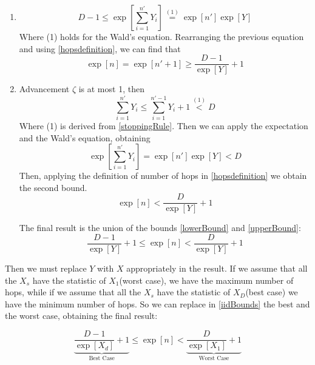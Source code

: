 \begin{enumerate}
		\item
			$$ D-1 \le \exp\left[\sum_{i=1}^{n'} Y_i\right] \stackrel{(1)}{=} \exp[n']\exp[Y] $$
			Where (1) holds for the Wald's equation. Rearranging the previous equation and using \eqref{hopsdefinition}, we can find that
			\begin{equation}\label{lowerBound}
				\exp[n] = \exp[n'+1] \ge \frac{D-1}{\exp[Y]} +1
			\end{equation}
		\item
			Advancement $\zeta$ is at most 1, then
			$$\sum_{i=1}^{n'} Y_i \le \sum_{i=1}^{n'-1} Y_i +1 \stackrel{(1)}{<} D$$
			Where (1) is derived from \eqref{stoppingRule}. Then we can apply the expectation and the Wald's equation, obtaining
			$$\exp\left[\sum_{i=1}^{n'} Y_i\right] = \exp[n']\exp[Y] < D$$
			Then, applying the definition of number of hops in \eqref{hopsdefinition} we obtain the second bound.
			\begin{equation}\label{upperBound}
				\exp[n] < \frac{D}{\exp[Y]} + 1
			\end{equation}

			The final result is the union of the bounds \eqref{lowerBound} and \eqref{upperBound}:
			\begin{equation}\label{iidBounds}
				\frac{D-1}{\exp[Y]} +1 \le \exp[n] < \frac{D}{\exp[Y]} + 1
			\end{equation}
\end{enumerate}
Then we must replace $Y$ with $X$ appropriately in the result.
If we assume that all the $X_s$ have the statistic of $X_1$(worst case), we have the maximum number of hops, while if we assume that all the $X_s$ have the statistic of $X_D$(best case) we have the minimum number of hops. So we can replace in \eqref{iidBounds} the best and the worst case, obtaining the final result:

\begin{equation}\label{finalBounds}
	\underbrace{\frac{D-1}{\exp[X_d]} +1}_\text{Best Case} \le \exp[n] < \underbrace{\frac{D}{\exp[X_1]} + 1}_\text{Worst Case}
\end{equation}
